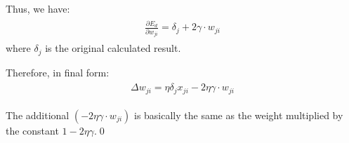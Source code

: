 \documentclass[preview]{standalone}
\begin{document}
Thus, we have:
\begin{align}
\begin{split}
\frac{\partial E_d}{\partial w_{ji}}
= \delta_j + 2 \gamma \cdot w_{ji}
\end{split}
\end{align}
where $\delta_j$ is the original calculated result.

Therefore, in final form:
\begin{align}
\begin{split}
    \Delta w_{ji} = \eta\delta_jx_{ji} - 2\eta\gamma \cdot w_{ji}
\end{split}
\end{align}

The additional $(-2\eta\gamma \cdot w_{ji})$ is basically the same as the
weight multiplied by the constant $1 - 2\eta\gamma$.\qed
\end{document}
